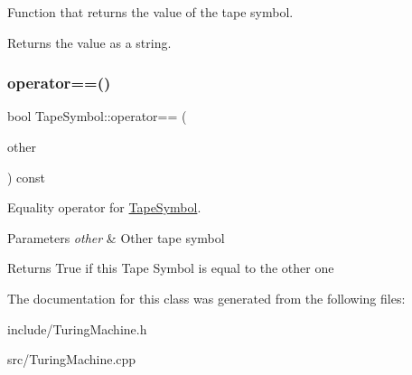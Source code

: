 Function that returns the value of the tape symbol. 

\begin{DoxyReturn}{Returns}
the value as a string. 
\end{DoxyReturn}
\mbox{\label{classTapeSymbol_a4b36c3f7a3631d02d77c1eb2efa063a0}} 
\subsubsection{\texorpdfstring{operator==()}{operator==()}}
{\footnotesize\ttfamily bool Tape\+Symbol\+::operator== (\begin{DoxyParamCaption}\item[{\hyperlink{classTapeSymbol}{Tape\+Symbol} \&}]{other }\end{DoxyParamCaption}) const}



Equality operator for \hyperlink{classTapeSymbol}{Tape\+Symbol}. 


\begin{DoxyParams}{Parameters}
{\em other} & Other tape symbol \\
\hline
\end{DoxyParams}
\begin{DoxyReturn}{Returns}
True if this Tape Symbol is equal to the other one 
\end{DoxyReturn}


The documentation for this class was generated from the following files\+:\begin{DoxyCompactItemize}
\item 
include/Turing\+Machine.\+h\item 
src/Turing\+Machine.\+cpp\end{DoxyCompactItemize}
